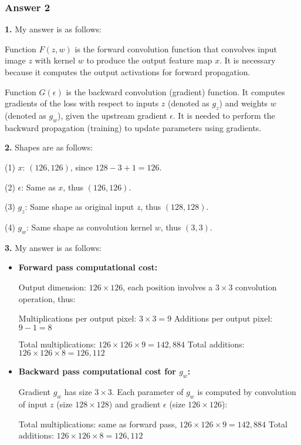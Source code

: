 \subsubsection*{Answer 2}

\textbf{1.} My answer is as follows:

Function $F(z, w)$ is the forward convolution function that convolves input image $z$ with kernel $w$ to produce the output feature map $x$. It is necessary because it computes the output activations for forward propagation.

Function $G(\epsilon)$ is the backward convolution (gradient) function. It computes gradients of the loss with respect to inputs $z$ (denoted as $g_z$) and weights $w$ (denoted as $g_w$), given the upstream gradient $\epsilon$. It is needed to perform the backward propagation (training) to update parameters using gradients.

\vspace{1em}

\textbf{2.} Shapes are as follows:

 (1) $x$: $(126, 126)$, since $128 - 3 + 1 = 126$.
 
 (2) $\epsilon$: Same as $x$, thus $(126, 126)$.
 
 (3) $g_z$: Same shape as original input $z$, thus $(128, 128)$.
 
 (4) $g_w$: Same shape as convolution kernel $w$, thus $(3, 3)$.
  
\vspace{1em}

\textbf{3.} My answer is as follows:
\begin{itemize}
 \item \textbf{Forward pass computational cost:}

Output dimension: $126\times126$, each position involves a $3\times3$ convolution operation, thus:

Multiplications per output pixel: $3 \times 3 = 9$  
Additions per output pixel: $9 - 1 = 8$

Total multiplications: $126 \times 126 \times 9 = 142,884$  
Total additions: $126 \times 126 \times 8 = 126,112$

 \item \textbf{Backward pass computational cost for $g_w$:}

Gradient $g_w$ has size $3\times3$. Each parameter of $g_w$ is computed by convolution of input $z$ (size $128\times128$) and gradient $\epsilon$ (size $126\times126$):

Total multiplications: same as forward pass, $126\times126\times9=142,884$  
Total additions: $126\times126\times8=126,112$

\end{itemize}